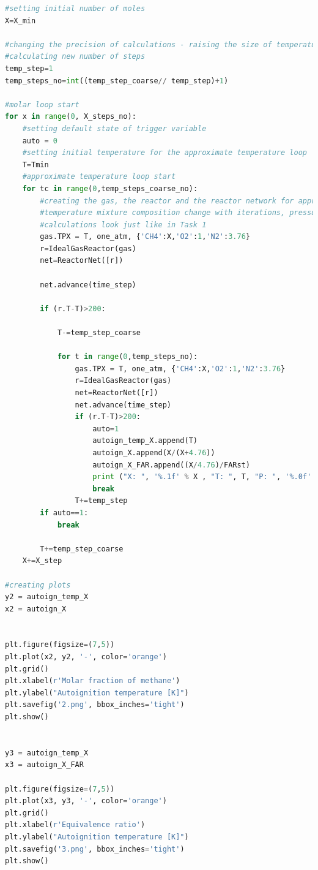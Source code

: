 \documentclass[a4paper]{article}[11pt]
\begin{document}
\begin{lstlisting}[language=Python]
#setting initial number of moles
X=X_min

#changing the precision of calculations - raising the size of temperature step
#calculating new number of steps
temp_step=1
temp_steps_no=int((temp_step_coarse// temp_step)+1)

#molar loop start
for x in range(0, X_steps_no):
    #setting default state of trigger variable
    auto = 0
    #setting initial temperature for the approximate temperature loop
    T=Tmin
    #approximate temperature loop start
    for tc in range(0,temp_steps_coarse_no):
        #creating the gas, the reactor and the reactor network for approximate calculations
        #temperature mixture composition change with iterations, pressure is constant and equal to one atmosphere
        #calculations look just like in Task 1 
        gas.TPX = T, one_atm, {'CH4':X,'O2':1,'N2':3.76}
        r=IdealGasReactor(gas)
        net=ReactorNet([r])
       
        net.advance(time_step)
        
        if (r.T-T)>200:
            
            T-=temp_step_coarse
           
            for t in range(0,temp_steps_no):
                gas.TPX = T, one_atm, {'CH4':X,'O2':1,'N2':3.76}
                r=IdealGasReactor(gas)
                net=ReactorNet([r])
                net.advance(time_step)
                if (r.T-T)>200:
                    auto=1
                    autoign_temp_X.append(T)
                    autoign_X.append(X/(X+4.76))
                    autoign_X_FAR.append((X/4.76)/FARst)
                    print ("X: ", '%.1f' % X , "T: ", T, "P: ", '%.0f' % one_atm)
                    break
                T+=temp_step 
        if auto==1:
            break
                
        T+=temp_step_coarse
    X+=X_step
    
#creating plots
y2 = autoign_temp_X
x2 = autoign_X


plt.figure(figsize=(7,5))
plt.plot(x2, y2, '-', color='orange')
plt.grid()
plt.xlabel(r'Molar fraction of methane')
plt.ylabel("Autoignition temperature [K]")
plt.savefig('2.png', bbox_inches='tight')
plt.show()


y3 = autoign_temp_X
x3 = autoign_X_FAR

plt.figure(figsize=(7,5))
plt.plot(x3, y3, '-', color='orange')
plt.grid()
plt.xlabel(r'Equivalence ratio')
plt.ylabel("Autoignition temperature [K]")
plt.savefig('3.png', bbox_inches='tight')
plt.show()


        	
\end{lstlisting}
    \newpage
\end{document}
